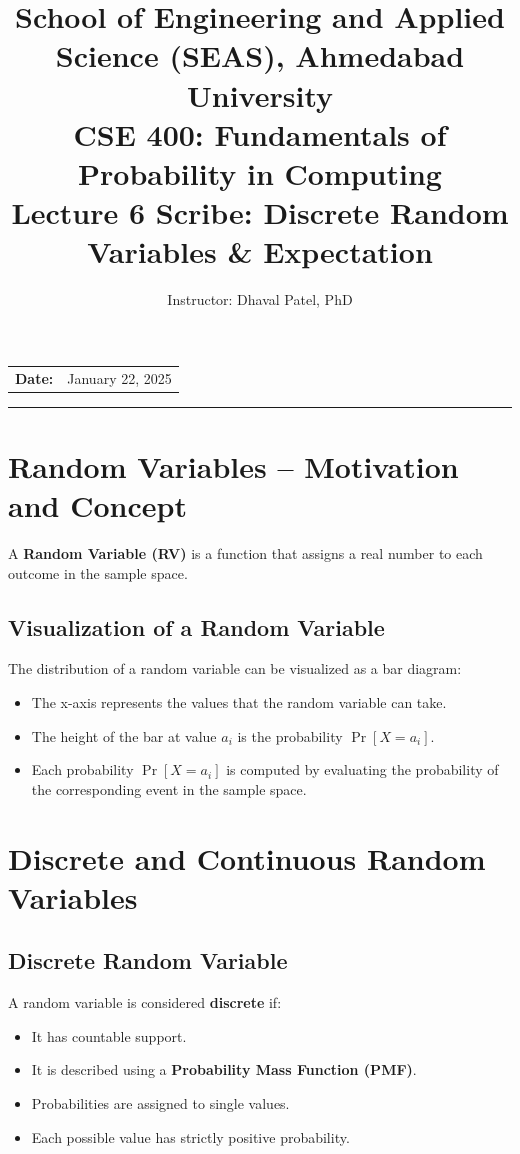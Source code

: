 \documentclass[11pt]{article}
\title{
    \normalsize School of Engineering and Applied Science (SEAS), Ahmedabad University \\
    \vspace{0.2cm}
    \textbf{CSE 400: Fundamentals of Probability in Computing}\\
    \Large Lecture 6 Scribe: Discrete Random Variables \& Expectation
}
\author{Instructor: Dhaval Patel, PhD}
\date{}
\begin{document}
\maketitle

\vspace{-1cm}
\begin{center}
    \begin{tabular}{ll}
        \textbf{Date:} & {January 22, 2025 \hspace{2.2in}} \\ [1.5ex]
    \end{tabular}
\end{center}

\hrule
\vspace{0.5cm}


\section{Random Variables – Motivation and Concept}
A \textbf{Random Variable (RV)} is a function that assigns a real number to each outcome in the sample space.

\subsection*{Visualization of a Random Variable}
The distribution of a random variable can be visualized as a bar diagram:
\begin{itemize}
    \item The x-axis represents the values that the random variable can take.
    \item The height of the bar at value $a_i$ is the probability $\Pr[X = a_i]$.
    \item Each probability $\Pr[X = a_i]$ is computed by evaluating the probability of the corresponding event in the sample space.
\end{itemize}

\section{Discrete and Continuous Random Variables}

\subsection{Discrete Random Variable}
A random variable is considered \textbf{discrete} if:
\begin{itemize}
    \item It has countable support.
    \item It is described using a \textbf{Probability Mass Function (PMF)}.
    \item Probabilities are assigned to single values.
    \item Each possible value has strictly positive probability.
\end{itemize}
\end{document}
